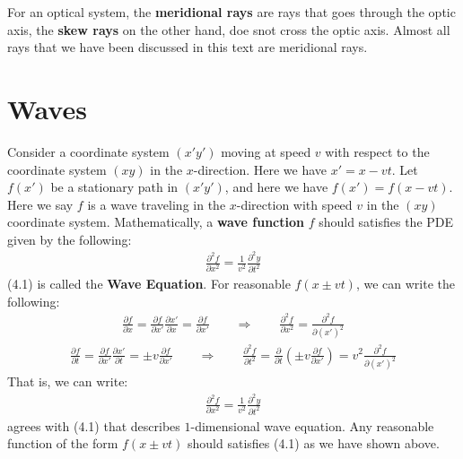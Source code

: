 \documentclass[11pt]{book}
\theoremstyle{break}
\theoremstyle{break}
\begin{document}
For an optical system, the \textbf{meridional rays} are rays that goes through the optic axis, the \textbf{skew rays} on the other hand, doe snot cross the optic axis. Almost all rays that we have been discussed in this text are meridional rays. \newpage


\chapter{Waves}
Consider a coordinate system $(x'y')$ moving at speed $v$ with respect to the coordinate system $(xy)$ in the $x$-direction. Here we have $x' = x-vt$. Let $f(x')$ be a stationary path in $(x'y')$, and here we have $f(x') = f(x-vt)$. Here we say $f$ is a wave traveling in the $x$-direction with speed $v$ in the $(xy)$ coordinate system. Mathematically, a \textbf{wave function} $f$ should satisfies the PDE given by the following:
\begin{align}
\frac{\partial^2 f}{\partial x^2} = \frac{1}{v^2}\frac{\partial^2 y}{\partial t^2}
\end{align}
(4.1) is called the \textbf{Wave Equation}. For reasonable $f(x\pm vt)$, we can write the following:
\begin{align*}
\frac{\partial f}{\partial x} = \frac{\partial f}{\partial x'}\frac{\partial x'}{\partial x} = \frac{\partial f}{\partial x'} \qquad \Rightarrow \qquad \frac{\partial^2 f}{\partial x^2} = \frac{\partial^2 f}{\partial (x')^2}
\end{align*}
\begin{align*}
\frac{\partial f}{\partial t} = \frac{\partial f}{\partial x'} \frac{\partial x'}{\partial t} = \pm v \frac{\partial f}{\partial x'} \qquad \Rightarrow \qquad \frac{\partial^2 f}{\partial t^2} = \frac{\partial}{\partial t}\left( \pm v \frac{\partial f}{\partial x'}\right) = v^2 \frac{\partial^2f}{\partial (x')^2}
\end{align*}
That is, we can write:
\begin{align*}
\frac{\partial^2 f}{\partial x^2} = \frac{1}{v^2}\frac{\partial^2 y}{\partial t^2}
\end{align*}
agrees with (4.1) that describes $1$-dimensional wave equation. Any reasonable function of the form $f(x \pm vt)$ should satisfies (4.1) as we have shown above.\\
\end{document}
